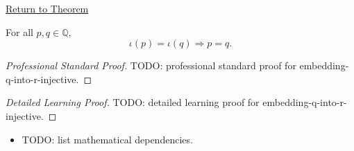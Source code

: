 \newpage
{}
\label{prf:embedding-q-into-r-injective}

\begin{remark*}[Return]
\hyperref[thm:embedding-q-into-r-injective]{Return to Theorem}
\end{remark*}

\begin{theorem*}
For all $p,q\in\mathbb{Q}$,
\[
\iota(p)=\iota(q) \Longrightarrow p=q.
\]
\end{theorem*}

\begin{proof}[Professional Standard Proof]
\LRAProofBodyStart
TODO: professional standard proof for embedding-q-into-r-injective.
\end{proof}

\begin{proof}[Detailed Learning Proof]
\LRAProofBodyStart
TODO: detailed learning proof for embedding-q-into-r-injective.
\end{proof}

\begin{remark*}
\end{remark*}

\begin{dependencies}
\begin{itemize}
  \item TODO: list mathematical dependencies.
\end{itemize}
\end{dependencies}

\clearpage
